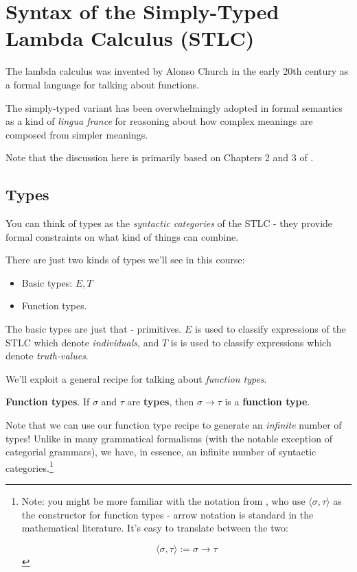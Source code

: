 \documentclass[letterpaper,parskip=half]{scrartcl}
\begin{document}
\section{Syntax of the Simply-Typed Lambda Calculus (STLC)}
\label{sec:org06b850b}

The lambda calculus was invented by Alonso Church in the early 20th century as a formal language for talking about functions.

The simply-typed variant has been overwhelmingly adopted in formal semantics as a kind of \emph{lingua france} for reasoning about how complex meanings are composed from simpler meanings.

Note that the discussion here is primarily based on Chapters 2 and 3 of \autocite{Carpenter1998}.

\subsection{Types}
\label{sec:org87c3703}

You can think of types as the \emph{syntactic categories} of the STLC - they provide formal constraints on what kind of things can combine.

There are just two kinds of types we'll see in this course:

\begin{itemize}
\item Basic types: \(E, T\)
\item Function types.
\end{itemize}

The basic types are just that - primitives. \(E\) is used to classify expressions of the STLC which denote \emph{individuals}, and \(T\) is is used to classify expressions which denote \emph{truth-values}.

We'll exploit a general recipe for talking about \emph{function types}.

\begin{definition}
\textbf{Function types}. If \(\sigma\) and \(\tau\) are \textbf{types}, then \(\sigma \to \tau\) is a \textbf{function type}.
\end{definition}

Note that we can use our function type recipe to generate an \emph{infinite} number of types! Unlike in many grammatical formalisms (with the notable exception of categorial grammars), we have, in essence, an infinite number of syntactic categories.\footnote{Note: you might be more familiar with the notation from \autocite{HeimKratzer1998}, who use \(\langle\sigma,\tau \rangle\) as the constructor for function types - arrow notation is standard in the mathematical literature. It's easy to translate between the two:

\[\langle\sigma ,\tau \rangle := \sigma \to \tau \]}
\end{document}
